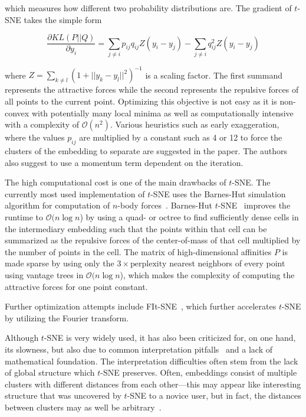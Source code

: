 which measures how different two probability distributions are. The gradient of $t$-SNE
takes the simple form

\begin{equation}
    \frac{\partial KL(P||Q)}{\partial y_i} = \sum_{j \neq i} p_{ij}q_{ij}Z(y_i - y_j) - \sum_{j \neq i} q_{ij}^2Z(y_i - y_j)
\end{equation}

where $Z = \sum_{k \neq l} (1 + ||y_k - y_l||^2)^{-1}$ is a scaling factor. The
first summand represents the attractive forces while the second represents the
repulsive forces of all points to the current point. Optimizing this objective
is not easy as it is non-convex with potentially many local minima as well as
computationally intensive with a complexity of $\mathcal{O}(n^2)$. Various
heuristics such as early exaggeration, where the values $p_{ij}$ are multiplied
by a constant such as 4 or 12 to force the clusters of the embedding to
separate are suggested in the paper. The authors also suggest to use a momentum
term dependent on the iteration.

The high computational cost is one of the main drawbacks of $t$-SNE. The
currently most used implementation of $t$-SNE uses the Barnes-Hut simulation
algorithm for computation of $n$-body forces~\cite{bh}. Barnes-Hut
$t$-SNE~\cite{bhtsne} improves the runtime to $\mathcal{O}(n \log n$) by using
a quad- or octree to find sufficiently dense cells in the intermediary
embedding such that the points within that cell can be summarized as the
repulsive forces of the center-of-mass of that cell multiplied by the number of
points in the cell. The matrix of high-dimensional affinities $P$ is made
sparse by using only the $3 \times \text{perplexity}$ nearest neighbors of
every point using vantage trees in $\mathcal{O}(n \log n$), which makes the
complexity of computing the attractive forces for one point constant.

Further optimization attempts include FIt-SNE~\cite{fitsne}, which further
accelerates $t$-SNE by utilizing the Fourier transform.

Although $t$-SNE is very widely used, it has also been criticized for, on one
hand, its slowness, but also due to common interpretation
pitfalls~\cite{misread_tsne} and a lack of mathematical foundation. The
interpretation difficulties often stem from the lack of global structure which
$t$-SNE preserves. Often, embeddings consist of multiple clusters with
different distances from each other---this may appear like interesting
structure that was uncovered by $t$-SNE to a novice user, but in fact, the
distances between clusters may as well be arbitrary~\cite{misread_tsne,
art_tsne}.

